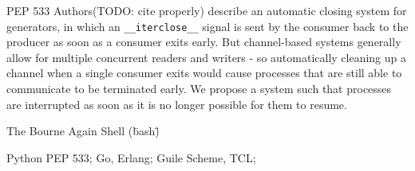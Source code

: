 \documentclass[format=sigconf, review=true, draft=true, screen=true]{acmart}
\begin{document}
PEP 533 Authors(TODO: cite properly) describe an automatic closing system for generators, in which an \verb/__iterclose__/ signal is sent by the consumer back to the producer as soon as a consumer exits early.
But channel-based systems generally allow for multiple concurrent readers and writers - so automatically cleaning up a channel when a single consumer exits would cause processes that are still able to communicate to be terminated early.
We propose a system such that processes are interrupted as soon as it is no longer possible for them to resume.

The Bourne Again Shell (\"bash\") 

Python PEP 533; Go, Erlang; Guile Scheme, TCL;
\end{document}
